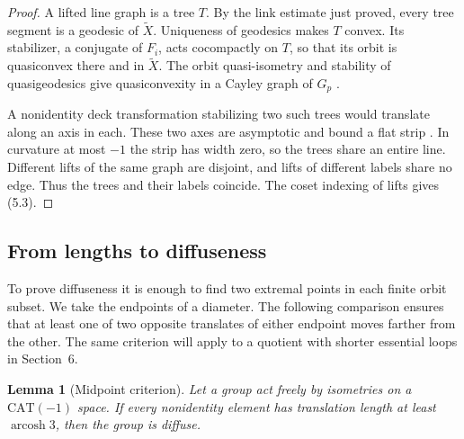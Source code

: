 \documentclass[11pt,a4paper]{article}
\newtheorem{lemma}[theorem]{Lemma}
\numberwithin{equation}{section}
\begin{document}
\begin{proof}
A lifted line graph is a tree \(T\). By the link estimate just proved, every tree segment is a geodesic of \(\widetilde X\). Uniqueness of geodesics makes \(T\) convex. Its stabilizer, a conjugate of \(F_i\), acts cocompactly on \(T\), so that its orbit is quasiconvex there and in \(\widetilde X\). The orbit quasi-isometry and stability of quasigeodesics give quasiconvexity in a Cayley graph of \(G_p\) \cite[I.8.19, III.H.1.7]{r7}.

A nonidentity deck transformation stabilizing two such trees would translate along an axis in each. These two axes are asymptotic and bound a flat strip \cite[II.2.13]{r7}. In curvature at most \(-1\) the strip has width zero, so the trees share an entire line. Different lifts of the same graph are disjoint, and lifts of different labels share no edge. Thus the trees and their labels coincide. The coset indexing of lifts gives (5.3).
\end{proof}

\subsection{From lengths to diffuseness}

To prove diffuseness it is enough to find two extremal points in each finite orbit subset. We take the endpoints of a diameter. The following comparison ensures that at least one of two opposite translates of either endpoint moves farther from the other. The same criterion will apply to a quotient with shorter essential loops in Section~6.

\begin{lemma}[Midpoint criterion]
Let a group act freely by isometries on a \(\mathrm{CAT}(-1)\) space. If every nonidentity element has translation length at least \(\operatorname{arcosh}3\), then the group is diffuse.
\end{lemma}
\end{document}
